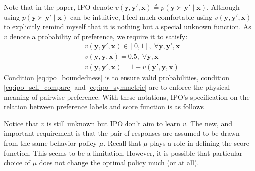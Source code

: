 \documentclass[11pt,a4paper]{article}
\begin{document}
Note that in the paper, IPO denote $v(\bm{y}, \bm{y}', \bm{x}) \triangleq p( \bm{y} \succ \bm{y}' \mid \bm{x} )$. Although using $p( \bm{y} \succ \bm{y}' \mid \bm{x} )$ can be intuitive, I feel much comfortable using $v(\bm{y}, \bm{y}', \bm{x})$ to explicitly remind myself that it is nothing but a special unknown function. As $v$ denote a probability of preference, we require it to satisfy:
\begin{subequations}
\begin{align}
&v(\bm{y}, \bm{y}', \bm{x}) \in [0, 1], \; \forall  \bm{y}, \bm{y}', \bm{x} \label{eq:ipo_boundedness}\\
&v(\bm{y}, \bm{y}, \bm{x}) = 0.5, \; \forall  \bm{y}, \bm{x} \label{eq:ipo_self_compare}\\
&v(\bm{y}, \bm{y}', \bm{x}) = 1 - v(\bm{y}', \bm{y}, \bm{x}) \label{eq:ipo_symmetric}
\end{align}
\end{subequations}
Condition \eqref{eq:ipo_boundedness} is to ensure valid probabilities, condition \eqref{eq:ipo_self_compare} and \eqref{eq:ipo_symmetric} are to enforce the physical meaning of pairwise preference.
With these notations, IPO's specification on the relation between preference labels and score function is as follows
\begin{tcolorbox}[center]
\end{tcolorbox}
Notice that $v$ is still unknown but IPO don't aim to learn $v$. The new, and important requirement is that the pair of responses are assumed to be drawn from the same behavior policy $\mu$. Recall that $\mu$ plays a role in defining the score function. This seems to be a limitation. However, it is possible that particular choice of $\mu$ does not change the optimal policy much (or at all).

\end{document}
